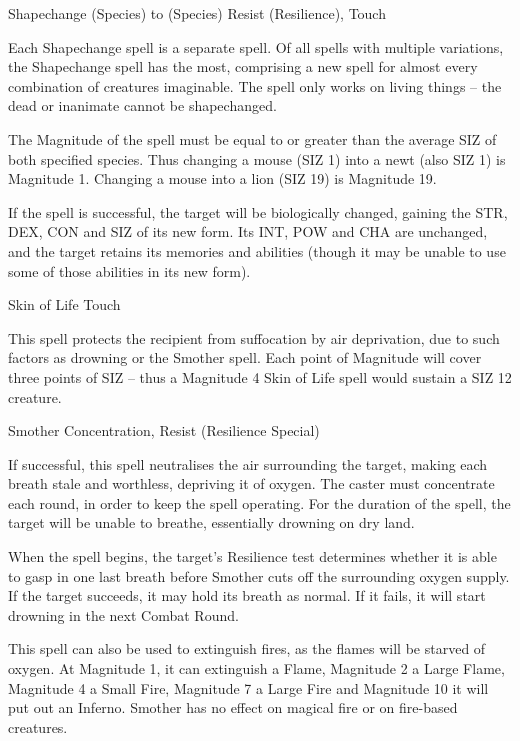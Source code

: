 \begin{rpg-spell}
{Shapechange (Species) to (Species)}
{Resist (Resilience), Touch}

Each Shapechange spell is a separate spell. Of all spells with multiple variations, the Shapechange spell has the most, comprising a new spell for almost every combination of creatures imaginable. The spell only works on living things – the dead or inanimate cannot be shapechanged. 

The Magnitude of the spell must be equal to or greater than the average SIZ of both specified species. Thus changing a mouse (SIZ 1) into a newt (also SIZ 1) is Magnitude 1. Changing a mouse into a lion (SIZ 19) is Magnitude 19. 

If the spell is successful, the target will be biologically changed, gaining the STR, DEX, CON and SIZ of its new form. Its INT, POW and CHA are unchanged, and the target retains its memories and abilities (though it may be unable to use some of those abilities in its new form). 
\end{rpg-spell}


\begin{rpg-spell}
{Skin of Life}
{Touch}

This spell protects the recipient from suffocation by air deprivation, due to such factors as drowning or the Smother spell. Each point of Magnitude will cover three points of SIZ – thus a Magnitude 4 Skin of Life spell would sustain a SIZ 12 creature. 
\end{rpg-spell}


\begin{rpg-spell}
{Smother}
{Concentration, Resist (Resilience Special)}

If successful, this spell neutralises the air surrounding the target, making each breath stale and worthless, depriving it of oxygen. The caster must concentrate each round, in order to keep the spell operating. For the duration of the spell, the target will be unable to breathe, essentially drowning on dry land. 

When the spell begins, the target’s Resilience test determines whether it is able to gasp in one last breath before Smother cuts off the surrounding oxygen supply. If the target succeeds, it may hold its breath as normal. If it fails, it will start drowning in the next Combat Round. 

This spell can also be used to extinguish fires, as the flames will be starved of oxygen. At Magnitude 1, it can extinguish a Flame, Magnitude 2 a Large Flame, Magnitude 4 a Small Fire, Magnitude 7 a Large Fire and Magnitude 10 it will put out an Inferno. Smother has no effect on magical fire or on fire-based creatures. 
\end{rpg-spell}


